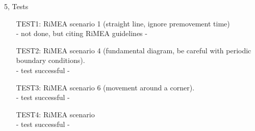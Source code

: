 \documentclass[10pt,a4paper]{article}
\begin{document}
\begin{task}{5, Tests}
\begin{enumerate}
\item[TEST1:] RiMEA scenario 1 (straight line, ignore premovement time)\\
- not done, but citing RiMEA guidelines -
\item[TEST2:] RiMEA scenario 4 (fundamental diagram, be careful with periodic boundary conditions).\\
- test successful - 
\item[TEST3:] RiMEA scenario 6 (movement around a corner).\\
- test successful - 
\item[TEST4:] RiMEA scenario\\
- test successful - 
\end{enumerate}
\end{task}
\end{document}

